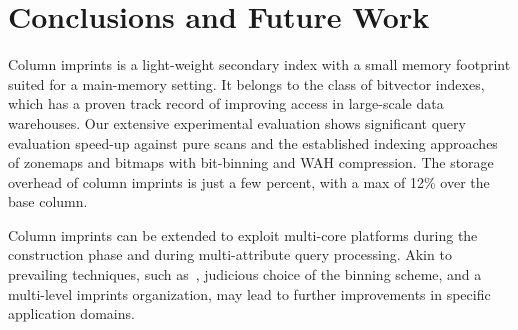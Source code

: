 \section{Conclusions and Future Work}\label{sec:conclusions}

Column imprints is a light-weight secondary index with a small memory
footprint suited for a main-memory setting. It belongs to the class of
bitvector indexes, which has a proven track record of improving access in
large-scale data warehouses. Our extensive experimental evaluation
shows significant query evaluation speed-up against pure scans and the
established indexing approaches of zonemaps and bitmaps with bit-binning and
WAH compression. The storage overhead of column imprints is just a few percent,
with a max of 12\% over the base column.

Column imprints can be extended to exploit multi-core
platforms during the construction phase and during multi-attribute query
processing. Akin to prevailing techniques, such as~\cite{SW07,WMC10}, judicious
choice of the binning scheme, and a multi-level imprints organization, may
lead to further improvements in specific application domains.
